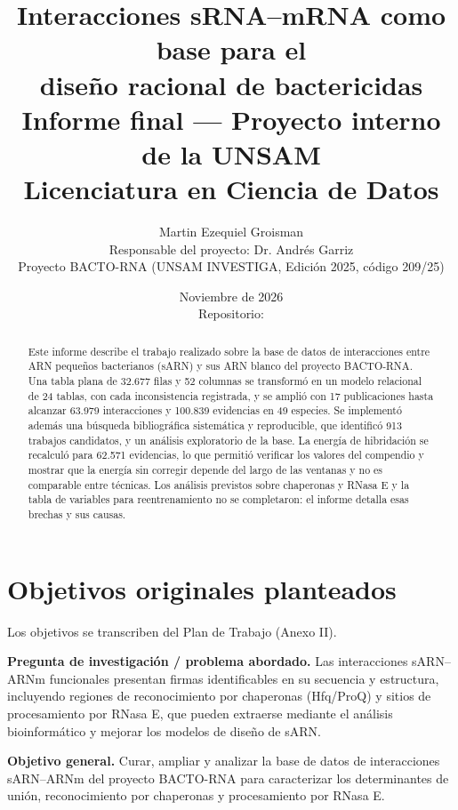 \documentclass[11pt,a4paper]{article}
\title{\textbf{Interacciones sRNA--mRNA como base para el\\ diseño racional de bactericidas}\\[0.6em]
\large Informe final --- Proyecto interno de la UNSAM\\ Licenciatura en Ciencia de Datos}
\author{Martin Ezequiel Groisman\\[0.2em] \small Responsable del proyecto: Dr. Andrés Garriz\\ \small Proyecto BACTO-RNA (UNSAM INVESTIGA, Edición 2025, código 209/25)}
\date{Noviembre de 2026\\[0.8em] \small Repositorio: \repo}
\begin{document}

\setcounter{page}{1}
\maketitle

\begin{abstract}
\noindent
Este informe describe el trabajo realizado sobre la base de datos de interacciones entre ARN pequeños bacterianos (sARN) y sus ARN blanco del proyecto BACTO-RNA. Una tabla plana de 32.677 filas y 52 columnas se transformó en un modelo relacional de 24 tablas, con cada inconsistencia registrada, y se amplió con 17 publicaciones hasta alcanzar 63.979 interacciones y 100.839 evidencias en 49 especies. Se implementó además una búsqueda bibliográfica sistemática y reproducible, que identificó 913 trabajos candidatos, y un análisis exploratorio de la base. La energía de hibridación se recalculó para 62.571 evidencias, lo que permitió verificar los valores del compendio y mostrar que la energía sin corregir depende del largo de las ventanas y no es comparable entre técnicas. Los análisis previstos sobre chaperonas y RNasa E y la tabla de variables para reentrenamiento no se completaron: el informe detalla esas brechas y sus causas.
\end{abstract}

\tableofcontents
\newpage

\section{Objetivos originales planteados}

Los objetivos se transcriben del Plan de Trabajo (Anexo II).

\textbf{Pregunta de investigación / problema abordado.} Las interacciones sARN--ARNm funcionales presentan firmas identificables en su secuencia y estructura, incluyendo regiones de reconocimiento por chaperonas (Hfq/ProQ) y sitios de procesamiento por RNasa E, que pueden extraerse mediante el análisis bioinformático y mejorar los modelos de diseño de sARN.

\textbf{Objetivo general.} Curar, ampliar y analizar la base de datos de interacciones sARN--ARNm del proyecto BACTO-RNA para caracterizar los determinantes de unión, reconocimiento por chaperonas y procesamiento por RNasa E.
\end{document}
